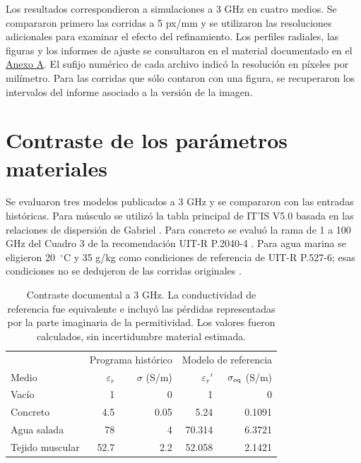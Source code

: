 \renewcommand{\tablename}{Cuadro}
Los resultados correspondieron a simulaciones a 3 GHz en cuatro medios. Se compararon primero las corridas a 5 px/mm y se utilizaron las resoluciones adicionales para examinar el efecto del refinamiento. Los perfiles radiales, las figuras y los informes de ajuste se consultaron en el material documentado en el \hyperref[an:fdtd-fuentes]{Anexo A}. El sufijo numérico de cada archivo indicó la resolución en píxeles por milímetro. Para las corridas que sólo contaron con una figura, se recuperaron los intervalos del informe asociado a la versión de la imagen.

\section{Contraste de los parámetros materiales}\label{sec:contraste-materiales}
Se evaluaron tres modelos publicados a 3 GHz y se compararon con las entradas históricas. Para músculo se utilizó la tabla principal de IT'IS V5.0 basada en las relaciones de dispersión de Gabriel \citep{itis2025materiales}. Para concreto se evaluó la rama de 1 a 100 GHz del Cuadro 3 de la recomendación UIT-R P.2040-4 \citep{uit2040materiales}. Para agua marina se eligieron 20~$^\circ$C y 35 g/kg como condiciones de referencia de UIT-R P.527-6; esas condiciones no se dedujeron de las corridas originales \citep{uit527materiales}.

\begin{table}[htbp]\centering\small
\caption{Contraste documental a 3 GHz. La conductividad de referencia fue equivalente e incluyó las pérdidas representadas por la parte imaginaria de la permitividad. Los valores fueron calculados, sin incertidumbre material estimada.}\label{tab:materiales-contraste}
\begin{tabular}{lrrrr}\hline
& \multicolumn{2}{c}{Programa histórico} & \multicolumn{2}{c}{Modelo de referencia} \\
Medio & $\varepsilon_r$ & $\sigma$ (S/m) & $\varepsilon_r'$ & $\sigma_{\rm eq}$ (S/m) \\ \hline
Vacío & 1 & 0 & 1 & 0 \\
Concreto & 4.5 & 0.05 & 5.24 & 0.1091 \\
Agua salada & 78 & 4 & 70.314 & 6.3721 \\
Tejido muscular & 52.7 & 2.2 & 52.058 & 2.1421 \\ \hline
\end{tabular}\end{table}

